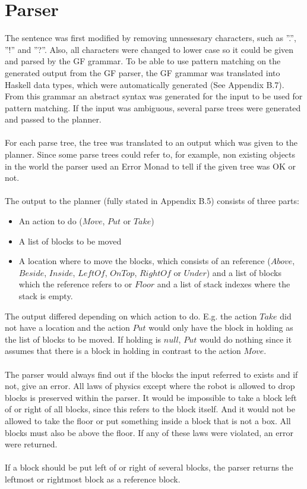 \section{Parser}
The sentence was first modified by removing unnessesary characters, such as
''.'', ''!'' and ''?''. Also, all characters were changed to lower case so it
could be given and parsed by the GF grammar. To be able to use pattern matching
on the generated output from the GF parser, the GF grammar was translated into
Haskell data types, which were automatically generated (See Appendix B.7). From
this grammar an abstract syntax was generated for the input to be used for
pattern matching. If the input was ambiguous, several parse trees were
generated and passed to the planner. \\\\
For each parse tree, the tree was translated to an output which was given to
the planner. Since some parse trees could refer to, for example, non existing
objects in the world the parser used an Error Monad to tell if the given tree
was OK or not. \\\\
The output to the planner (fully stated in Appendix B.5) consists of three parts:
\begin{itemize}
\item An action to do ($Move$, $Put$ or $Take$)
\item A list of blocks to be moved
\item A location where to move the blocks, which consists of an reference
        ($Above$, $Beside$, $Inside$, $LeftOf$, $OnTop$, $RightOf$ or $Under$)
        and a list of blocks which the reference refers to or $Floor$ and a
        list of stack indexes where the stack is empty.
\end{itemize}
The output differed depending on which action to do. E.g. the action $Take$ did
not have a location and the action $Put$ would only have the block in holding
as the list of blocks to be moved. If holding is $null$, $Put$ would do nothing
since it assumes that there is a block in holding in contrast to the action
$Move$.\\\\
The parser would always find out if the blocks the input referred to exists and
if not, give an error. All laws of physics except where the robot is allowed to
drop blocks is preserved within the parser. It would be impossible to take a
block left of or right of all blocks, since this refers to the block itself.
And it would not be allowed to take the floor or put something inside a block
that is not a box. All blocks must also be above the floor. If any of these
laws were violated, an error were returned.
 \\\\
If a block should be put left of or right of several blocks, the parser returns
the leftmost or rightmost block as a reference block. 

